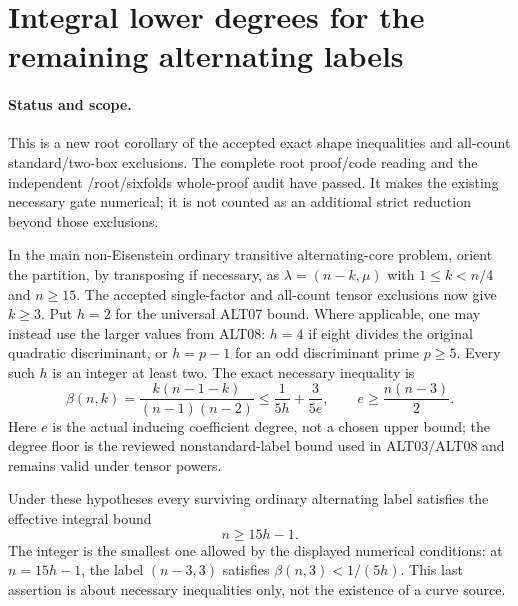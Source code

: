 \section{Integral lower degrees for the remaining alternating labels}
\label{sec:alternating-integral-cutoffs}

\paragraph{Status and scope.}
This is a new root corollary of the accepted exact shape inequalities
and all-count standard/two-box exclusions. The complete root proof/code
reading and the independent /root/sixfolds whole-proof audit have passed. It makes the existing necessary gate numerical; it is not
counted as an additional strict reduction beyond those exclusions.

In the main non-Eisenstein ordinary transitive alternating-core problem,
orient the partition, by transposing if necessary, as
$\lambda=(n-k,\mu)$ with $1\le k<n/4$ and $n\ge15$.
The accepted single-factor and all-count tensor exclusions now give
$k\ge3$. Put $h=2$ for the universal ALT07 bound. Where applicable,
one may instead use the larger values from ALT08: $h=4$ if eight
divides the original quadratic discriminant, or $h=p-1$ for an
odd discriminant prime $p\ge5$. Every such $h$ is an integer
at least two. The exact necessary inequality is
\[
 \beta(n,k)=\frac{k(n-1-k)}{(n-1)(n-2)}
       \le\frac1{5h}+\frac3{5e},
 \qquad e\ge\frac{n(n-3)}2.                         \tag{ALT9.1}
\]
Here $e$ is the actual inducing coefficient degree, not a chosen
upper bound; the degree floor is the reviewed nonstandard-label
bound used in ALT03/ALT08 and remains valid under tensor powers.

\begin{corollary}[HD-ALT-09]
\label{HD-ALT-09}
Under these hypotheses every surviving ordinary alternating label
satisfies the effective integral bound
\[
                              n\ge15h-1.                 \tag{ALT9.2}
\]
The integer is the smallest one allowed by the displayed numerical
conditions: at $n=15h-1$, the label $(n-3,3)$ satisfies
$\beta(n,3)<1/(5h)$. This last assertion is about necessary
inequalities only, not the existence of a curve source.
\end{corollary}

